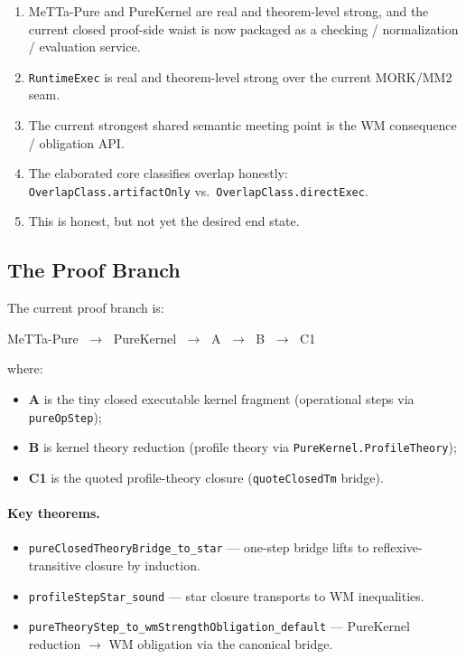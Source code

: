 \documentclass[11pt]{article}
\theoremstyle{remark}
\newcommand{\MeTTa}{\textup{MeTTa}}
\newcommand{\MORK}{\textup{MORK}}
\newcommand{\code}[1]{\texttt{#1}}
\newcommand{\leanref}[1]{\texttt{#1}}
\begin{document}
\begin{enumerate}
  \item \MeTTa-Pure and PureKernel are real and theorem-level strong, and the
  current closed proof-side waist is now packaged as a checking /
  normalization / evaluation service.
  \item \code{RuntimeExec} is real and theorem-level strong over the current
  \MORK{}/MM2 seam.
  \item The current strongest shared semantic meeting point is the WM
  consequence / obligation API.
  \item The elaborated core classifies overlap honestly:\\
  \leanref{OverlapClass.artifactOnly} vs.\
  \leanref{OverlapClass.directExec}.
  \item This is honest, but not yet the desired end state.
\end{enumerate}

\subsection{The Proof Branch}
\label{sec:proof-branch}

The current proof branch is:

\begin{center}
\MeTTa-Pure $\;\to\;$ PureKernel $\;\to\;$ A $\;\to\;$ B $\;\to\;$ C1
\end{center}

\noindent
where:

\begin{itemize}
  \item \textbf{A} is the tiny closed executable kernel fragment
  (operational steps via \leanref{pureOpStep});
  \item \textbf{B} is kernel theory reduction
  (profile theory via \leanref{PureKernel.ProfileTheory});
  \item \textbf{C1} is the quoted profile-theory closure
  (\leanref{quoteClosed\-Tm} bridge).
\end{itemize}

\paragraph{Key theorems.}
\begin{itemize}
  \item \leanref{pureClosedTheoryBridge\_to\_star} --- one-step bridge lifts
  to reflexive-transitive closure by induction.
  \item \leanref{profileStepStar\_sound} --- star closure transports to WM
  inequalities.
  \item \leanref{pureTheoryStep\_to\_wmStrengthObligation\_default} ---
  PureKernel reduction $\to$ WM obligation via the canonical bridge.
\end{itemize}
\end{document}
